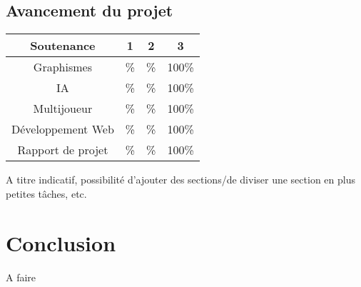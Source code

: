 \documentclass{article}
\begin{document}
\subsection{Avancement du projet}
\begin{center}
   \begin{tabular}{ | c || c | c | c | }
     \hline
 	 \textbf{Soutenance} & \textbf{1} & \textbf{2} & \textbf{3}    \\ \hline
     Graphismes & \% & \% & 100\% \\ \hline
     IA & \% & \%  & 100\% \\ \hline
     Multijoueur & \% & \% & 100\% \\ \hline
     Développement Web & \% & \% & 100\% \\ \hline
     Rapport de projet & \% & \% & 100\% \\
     \hline
   \end{tabular}
 \end{center}

A titre indicatif, possibilité d'ajouter des sections/de diviser une section en plus petites tâches, etc.

\section{Conclusion}
A faire
\end{document}
